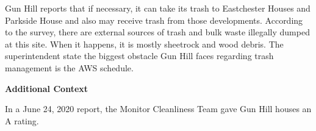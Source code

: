 Gun Hill reports that if necessary, it can take its trash to Eastchester Houses and Parkside House and also may receive trash from those developments. According to the survey, there are external sources of trash and bulk waste illegally dumped at this site. When it happens, it is mostly sheetrock and wood debris.  The superintendent state the biggest obstacle Gun Hill faces regarding trash management is the AWS schedule. 

\textbf{Additional Context}  

In a June 24, 2020 report, the Monitor Cleanliness Team gave Gun Hill houses an A rating.  